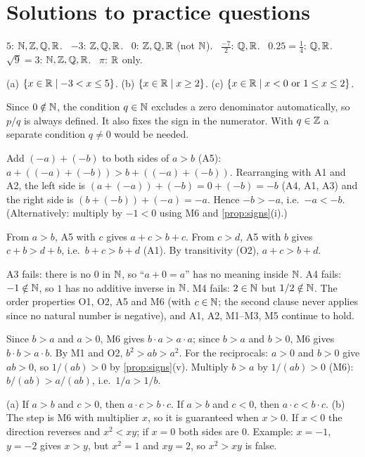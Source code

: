\section{Solutions to practice questions}
$5$: $\mathbb{N},\mathbb{Z},\mathbb{Q},\mathbb{R}$. \ $-3$: $\mathbb{Z},\mathbb{Q},\mathbb{R}$. \ $0$: $\mathbb{Z},\mathbb{Q},\mathbb{R}$ (not $\mathbb{N}$). \ $\tfrac{-7}{2}$: $\mathbb{Q},\mathbb{R}$. \
$0.25=\tfrac14$: $\mathbb{Q},\mathbb{R}$. \ $\sqrt9=3$: $\mathbb{N},\mathbb{Z},\mathbb{Q},\mathbb{R}$. \ $\pi$: $\mathbb{R}$ only.

(a) $\{x\in\mathbb{R}\mid -3<x\le5\}$. (b) $\{x\in\mathbb{R}\mid x\ge2\}$. (c) $\{x\in\mathbb{R}\mid x<0\text{ or }1\le x\le2\}$.

Since $0\notin\mathbb{N}$, the condition $q\in\mathbb{N}$ excludes a zero denominator automatically, so $p/q$ is always
defined. It also fixes the sign in the numerator. With $q\in\mathbb{Z}$ a separate condition $q\ne0$ would be needed.

Add $(-a)+(-b)$ to both sides of $a>b$ (A5): $a+((-a)+(-b))>b+((-a)+(-b))$. Rearranging with A1 and A2,
the left side is $(a+(-a))+(-b)=0+(-b)=-b$ (A4, A1, A3) and the right side is $(b+(-b))+(-a)=-a$. Hence
$-b>-a$, i.e.\ $-a<-b$. (Alternatively: multiply by $-1<0$ using M6 and \cref{prop:signs}(i).)

From $a>b$, A5 with $c$ gives $a+c>b+c$. From $c>d$, A5 with $b$ gives $c+b>d+b$, i.e.\ $b+c>b+d$ (A1).
By transitivity (O2), $a+c>b+d$.

A3 fails: there is no $0$ in $\mathbb{N}$, so ``$a+0=a$'' has no meaning inside $\mathbb{N}$. A4 fails: $-1\notin\mathbb{N}$, so $1$
has no additive inverse in $\mathbb{N}$. M4 fails: $2\in\mathbb{N}$ but $1/2\notin\mathbb{N}$. The order properties O1, O2, A5 and M6
(with $c\in\mathbb{N}$; the second clause never applies since no natural number is negative), and A1, A2, M1--M3, M5
continue to hold.

Since $b>a$ and $a>0$, M6 gives $b\cdot a>a\cdot a$; since $b>a$ and $b>0$, M6 gives $b\cdot b>a\cdot b$. By M1 and
O2, $b^2>ab>a^2$. For the reciprocals: $a>0$ and $b>0$ give $ab>0$, so $1/(ab)>0$ by \cref{prop:signs}(v).
Multiply $b>a$ by $1/(ab)>0$ (M6): $b/(ab)>a/(ab)$, i.e.\ $1/a>1/b$.

(a) If $a>b$ and $c>0$, then $a\cdot c>b\cdot c$. If $a>b$ and $c<0$, then $a\cdot c<b\cdot c$.
(b) The step is M6 with multiplier $x$, so it is guaranteed when $x>0$. If $x<0$ the direction reverses and
$x^2<xy$; if $x=0$ both sides are $0$. Example: $x=-1$, $y=-2$ gives $x>y$, but $x^2=1$ and $xy=2$, so
$x^2>xy$ is false.

